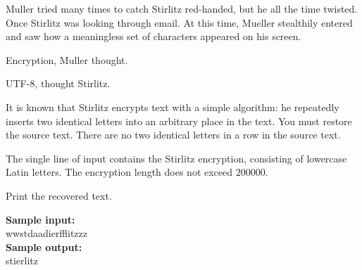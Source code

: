 \documentclass[a4paper]{article}
\begin{document}
Muller tried many times to catch Stirlitz red-handed, but he all the time twisted. Once Stirlitz was looking through email. At this time, Mueller stealthily entered and saw how a meaningless set of characters appeared on his screen.

Encryption, Muller thought.

UTF-8, thought Stirlitz.

It is known that Stirlitz encrypts text with a simple algorithm: he repeatedly inserts two identical letters into an arbitrary place in the text. You must restore the source text. There are no two identical letters in a row in the source text.

The single line of input contains the Stirlitz encryption, consisting of lowercase Latin letters. The encryption length does not exceed $200000$.

Print the recovered text.

\LINE

\noindent \textbf{Sample input:}\\
wwstdaadierfflitzzz\\


\noindent \textbf{Sample output:}\\
stierlitz\\
\end{document}
